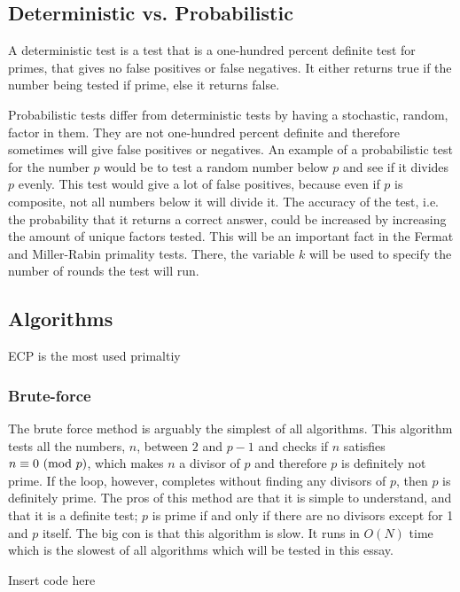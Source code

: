 \documentclass[main.tex]{subfiles}
\begin{document}
\subsection{Deterministic vs. Probabilistic}
A deterministic test is a test that is a one-hundred percent definite test for primes, that gives no false positives or false negatives. It either returns true if the number being tested if prime, else it returns false. 

Probabilistic tests differ from deterministic tests by having a stochastic, random, factor in them. They are not one-hundred percent definite and therefore sometimes will give false positives or negatives. An example of a probabilistic test for the number $p$ would be to test a random number below $p$ and see if it divides $p$ evenly. This test would give a lot of false positives, because even if $p$ is composite, not all numbers below it will divide it. The accuracy of the test, i.e. the probability that it returns a correct answer, could be increased by increasing the amount of unique factors tested. This will be an important fact in the Fermat and Miller-Rabin primality tests. There, the variable $k$ will be used to specify the number of rounds the test will run. 

\subsection{Algorithms}

ECP is the most used primaltiy

\subsubsection{Brute-force}
The brute force method is arguably the simplest of all algorithms. This algorithm tests all the numbers, $n$, between $2$ and $p-1$ and checks if $n$ satisfies $n \equiv 0 \ (\mathrm{mod}\ p)$, which makes $n$ a divisor of $p$ and therefore $p$ is definitely not prime. If the loop, however, completes without finding any divisors of $p$, then $p$ is definitely prime. The pros of this method are that it is simple to understand, and that it is a definite test; $p$ is prime if and only if there are no divisors except for 1 and $p$ itself. The big con is that this algorithm is slow. It runs in $O(N)$ time which is the slowest of all algorithms which will be tested in this essay. 

\begin{python}
    Insert code here
\end{python}
\end{document}
